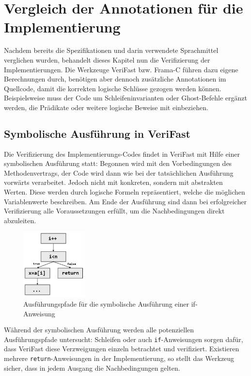 ﻿\chapter{Vergleich der Annotationen für die Implementierung}

Nachdem bereits die Spezifikationen und darin verwendete Sprachmittel verglichen wurden,
behandelt dieses Kapitel nun die Verifizierung der Implementierungen.
Die Werkzeuge VeriFast bzw. Frama-C führen dazu eigene Berechnungen durch, benötigen aber dennoch
zusätzliche Annotationen im Quellcode, damit die korrekten logische Schlüsse gezogen 
werden können. Beispielsweise muss der Code um Schleifeninvarianten oder 
Ghost-Befehle ergänzt werden, die Prädikate oder weitere logische Beweise mit einbeziehen.


\section{Symbolische Ausführung in VeriFast}

Die Verifizierung des Implementierungs-Codes findet in VeriFast mit Hilfe einer symbolischen Ausführung statt:
Begonnen wird mit den Vorbedingungen des Methodenvertrags, der Code wird dann wie bei der tatsächlichen
Ausführung vorwärts verarbeitet. Jedoch nicht mit konkreten, sondern mit 
abstrakten Werten. Diese werden durch logische Formeln repräsentiert, welche die möglichen Variablenwerte 
beschreiben. Am Ende der Ausführung sind dann bei erfolgreicher Verifizierung alle Voraussetzungen
erfüllt, um die Nachbedingungen direkt abzuleiten.

\begin{figure}
	\centering
		\includegraphics[width=0.3\textwidth]{images/symbolic_execution.png}
		\caption{Ausführungspfade für die symbolische Ausführung einer if-Anweisung}
\end{figure}

Während der symbolischen Ausführung werden alle potenziellen Ausführungspfade untersucht: Schleifen
oder auch \texttt{if}-Anweisungen sorgen dafür, dass VeriFast diese Verzweigungen einzeln betrachtet
und verifiziert. Existieren mehrere \texttt{return}-Anweisungen in der Implementierung, so stellt
das Werkzeug sicher, dass in jedem Ausgang die Nachbedingungen gelten.

